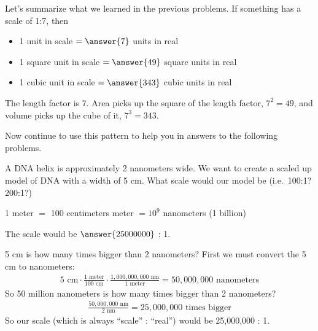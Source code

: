 \documentclass[12pt]{ximera}
\begin{document}
\begin{problem}
Let's summarize what we learned in the previous problems. If something has a scale of
1:7, then

\begin{itemize}
\item 1 unit in scale $= \answer{7}$ units in real
\item 1 square unit in scale $= \answer{49}$ square units in real
\item 1 cubic unit in scale $= \answer{343}$ cubic units in real
\end{itemize}

\begin{solution}
The length factor is 7. Area picks up the square of the length factor, $7^{2} = 49$,
and volume picks up the cube of it, $7^{3} = 343$.
\end{solution}
\end{problem}

Now continue to use this pattern to help you in answers to the following problems.

\begin{problem}
A DNA helix is approximately 2 nanometers wide. We want to create a scaled up model of
DNA with a width of 5 cm. What scale would our model be (i.e.\ 100:1? 200:1?)

\hspace{1em} 1 meter $=$ 100 centimeters  meter $= 10^{9}$ nanometers (1 billion)

The scale would be $\answer{25000000}$ : 1.

\begin{freeResponse}
\end{freeResponse}

\begin{solution}
5 cm is how many times bigger than 2 nanometers? First we must convert the 5 cm to
nanometers:
\begin{gather*}
5\text{ cm} \cdot \frac{1\text{ meter}}{100\text{ cm}} \cdot \frac{1{,}000{,}000{,}000\text{ nm}}{1\text{ meter}}
= 50{,}000{,}000\text{ nanometers}
\end{gather*}
So 50 million nanometers is how many times bigger than 2 nanometers?
\begin{gather*}
\frac{50{,}000{,}000\text{ nm}}{2\text{ nm}} = 25{,}000{,}000\text{ times bigger}
\end{gather*}
So our scale (which is always ``scale'' : ``real'') would be 25,000,000 : 1.
\end{solution}
\end{problem}
\end{document}
